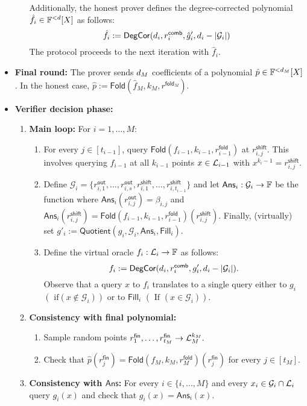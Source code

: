 \begin{itemize}
\begin{enumerate}
    Additionally, the honest prover defines the degree-corrected polynomial 
    $\hat{f}_i \in \field^{<\degree}[X]$ as follows:
    \[
        \hat{f}_i 
        :=\degcorr(\degree_i,r_{i}^{\mathsf{comb}},\hat{g}'_i,\degree_i-|\mathcal{G}_i|)
    \]
  The protocol proceeds to the next iteration with $\hat{f}_i$.
  \end{enumerate}   
  \item \textbf{Final round:} The prover sends $\degree_M$ coefficients of a polynomial $\hat{p}\in\field^{<\degree_M}[X]$. In the honest case, $\hat{p}:=\mathsf{Fold}(\hat{f}_M,k_M,r^{\mathsf{fold}_M})$.
  \item \textbf{Verifier decision phase:} 
  \begin{enumerate}
    \item \textbf{Main loop:} For $i=1,\ldots,M:$
    \begin{enumerate}
        \item For every $j\in [t_{i-1}]$, query $\mathsf{Fold}(f_{i-1},k_{i-1},r^{\mathsf{fold}}_{i-1})$ at $r^{\mathsf{shift}}_{i,j}$. This involves querying $f_{i-1}$ at all $k_{i-1}$ points $x\in{\evaldomain}_{i-1}$ with $x^{k_i-1}=r^{\mathsf{shift}}_{i,j}$.
        \item Define $\mathcal{G}_i=\{r^{\mathsf{out}}_{i,1},\ldots,r^{\mathsf{out}}_{i,s},r^{\mathsf{shift}}_{i,1},\ldots,r^{\mathsf{shift}}_{i,t_{i-1}}\}$ and let $\mathsf{Ans}_i:\mathcal{G}_i\rightarrow\field$ be the function where $\mathsf{Ans}_i(r^{\mathsf{out}}_{i,j})=\beta_{i,j}$ and $\mathsf{Ans}_{i}(r^{\mathsf{shift}}_{i,j})=\mathsf{Fold}(f_{i-1},k_{i-1},r^{\mathsf{fold}}_{i-1})(r^{\mathsf{shift}}_{i,j})$. Finally, (virtually) set $g'_i:=\mathsf{Quotient}(g_i,\mathcal{G}_i,\mathsf{Ans}_i,\mathsf{Fill}_i)$.
        \item Define the virtual oracle $f_i:\evaldomain_i\rightarrow\field$ as follows:
        \[
            f_i:=\degcorr(\degree_i,r^{\mathsf{comb}}_i,g'_i,\degree_i-|\mathcal{G}_i|).
        \]
        Observe that a query $x$ to $f_i$ translates to a single query either to $g_i$ $(\text{ if} (x\notin\mathcal{G}_i))$ or to $\mathsf{Fill}_i$ $(\text{ If } (x\in\mathcal{G}_i))$.
    \end{enumerate}
    \item\textbf{Consistency with final polynomial:} 
    \begin{enumerate}
        \item Sample random points $r^{\mathsf{fin}}_1,\ldots,r^{\mathsf{fin}}_{t_M}\rightarrow\evaldomain^{k_M}_{M}.$
        \item Check that $\hat{p}(r^{\mathsf{fin}}_j)=\mathsf{Fold}(f_M,k_M,r^{\mathsf{fold}}_M)(r^{\mathsf{fin}}_j)$ for every $j\in[t_M]$.
    \end{enumerate}
    \item\textbf{Consistency with $\mathsf{Ans}$:} For every $i\in\{i,\ldots,M\}$ and every $x_i\in\mathcal{G}_i\cap\evaldomain_i$ query $g_i(x)$ and check that $g_i(x)=\mathsf{Ans}_i(x)$.
  \end{enumerate}
\end{itemize}

